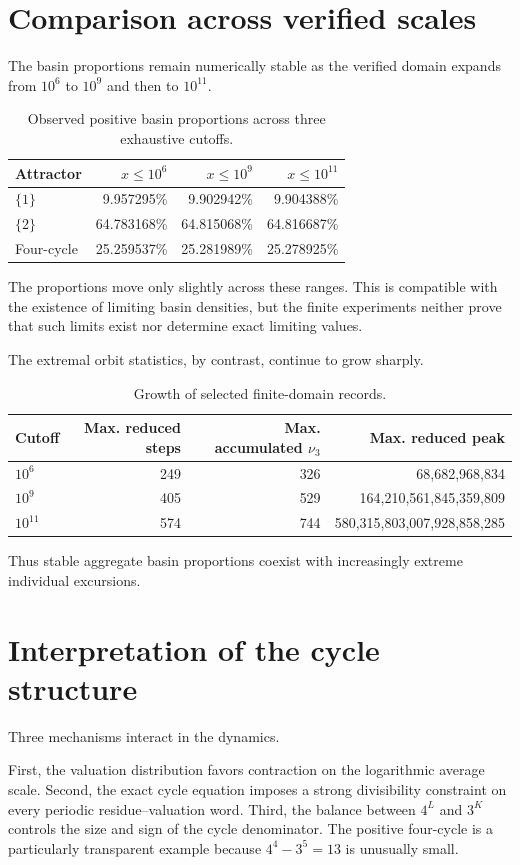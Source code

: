 \documentclass[11pt]{article}
\newcommand{\vthree}{\nu_3}
\begin{document}
\section{Comparison across verified scales}
The basin proportions remain numerically stable as the verified domain expands from $10^6$ to $10^9$ and then to $10^{11}$.
\begin{table}[ht]
\centering
\caption{Observed positive basin proportions across three exhaustive cutoffs.}
\label{tab:compare}
\begin{tabular}{lrrr}
\toprule
Attractor & $x\le10^6$ & $x\le10^9$ & $x\le10^{11}$\\
\midrule
$\{1\}$ & 9.957295\% & 9.902942\% & 9.904388\%\\
$\{2\}$ & 64.783168\% & 64.815068\% & 64.816687\%\\
Four-cycle & 25.259537\% & 25.281989\% & 25.278925\%\\
\bottomrule
\end{tabular}
\end{table}
The proportions move only slightly across these ranges.  This is compatible with the existence of limiting basin densities, but the finite experiments neither prove that such limits exist nor determine exact limiting values.

The extremal orbit statistics, by contrast, continue to grow sharply.
\begin{table}[ht]
\centering
\caption{Growth of selected finite-domain records.}
\label{tab:records}
\small
\begin{tabular}{lrrr}
\toprule
Cutoff & Max. reduced steps & Max. accumulated $\vthree$ & Max. reduced peak\\
\midrule
$10^6$ & 249 & 326 & 68,682,968,834\\
$10^9$ & 405 & 529 & 164,210,561,845,359,809\\
$10^{11}$ & 574 & 744 & 580,315,803,007,928,858,285\\
\bottomrule
\end{tabular}
\end{table}
Thus stable aggregate basin proportions coexist with increasingly extreme individual excursions.

\section{Interpretation of the cycle structure}
Three mechanisms interact in the dynamics.

First, the valuation distribution favors contraction on the logarithmic average scale.  Second, the exact cycle equation imposes a strong divisibility constraint on every periodic residue--valuation word.  Third, the balance between $4^L$ and $3^K$ controls the size and sign of the cycle denominator.  The positive four-cycle is a particularly transparent example because $4^4-3^5=13$ is unusually small.
\end{document}
